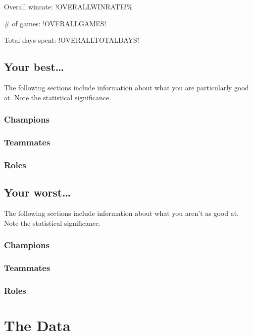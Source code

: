 \documentclass[paper=letter, landscape, oneside]{report}
\begin{document}

Overall winrate: !OVERALLWINRATE!\%

\# of games: !OVERALLGAMES!

Total days spent: !OVERALLTOTALDAYS!


\section{Your best\dots}

The following sections include information about what you are particularly good at. Note the statistical significance.

\subsection{Champions}


\subsection{Teammates}


\subsection{Roles}

\section{Your worst\dots}
The following sections include information about what you aren't as good at. Note the statistical significance.

\subsection{Champions}


\subsection{Teammates}


\subsection{Roles}

\chapter{The Data}
\end{document}
